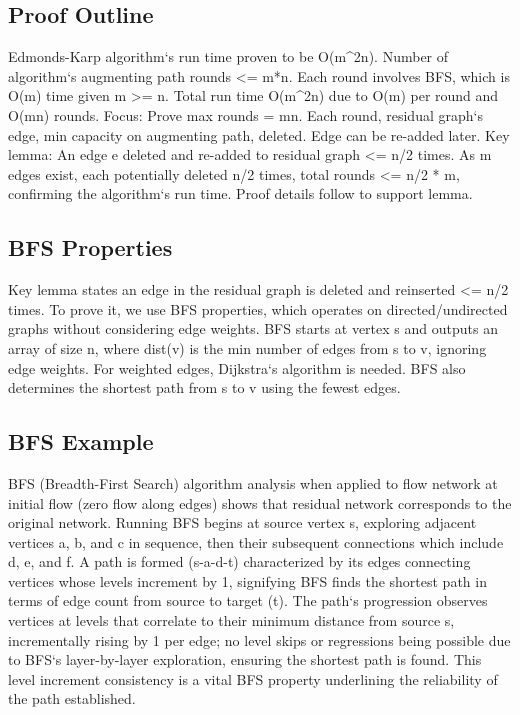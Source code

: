 \subsection*{Proof Outline}
Edmonds-Karp algorithm`s run time proven to be O(m\textasciicircum{}2n).
Number of algorithm`s augmenting path rounds \textless{}= m*n.
Each round involves BFS, which is O(m) time given m \textgreater{}= n.
Total run time O(m\textasciicircum{}2n) due to O(m) per round and O(mn) rounds.
Focus: Prove max rounds = mn.
Each round, residual graph`s edge, min capacity on augmenting path, deleted.
Edge can be re-added later.
Key lemma: An edge e deleted and re-added to residual graph \textless{}= n/2 times.
As m edges exist, each potentially deleted n/2 times, total rounds \textless{}= n/2 * m, confirming the algorithm`s run time.
Proof details follow to support lemma.

\subsection*{BFS Properties}
Key lemma states an edge in the residual graph is deleted and reinserted \textless{}= n/2 times.
To prove it, we use BFS properties, which operates on directed/undirected graphs without considering edge weights.
BFS starts at vertex s and outputs an array of size n, where dist(v) is the min number of edges from s to v, ignoring edge weights.
For weighted edges, Dijkstra`s algorithm is needed.
BFS also determines the shortest path from s to v using the fewest edges.

\subsection*{BFS Example}
BFS (Breadth-First Search) algorithm analysis when applied to flow network at initial flow (zero flow along edges) shows that residual network corresponds to the original network.
Running BFS begins at source vertex s, exploring adjacent vertices a, b, and c in sequence, then their subsequent connections which include d, e, and f.
A path is formed (s-a-d-t) characterized by its edges connecting vertices whose levels increment by 1, signifying BFS finds the shortest path in terms of edge count from source to target (t).
The path`s progression observes vertices at levels that correlate to their minimum distance from source s, incrementally rising by 1 per edge; no level skips or regressions being possible due to BFS`s layer-by-layer exploration, ensuring the shortest path is found.
This level increment consistency is a vital BFS property underlining the reliability of the path established.

